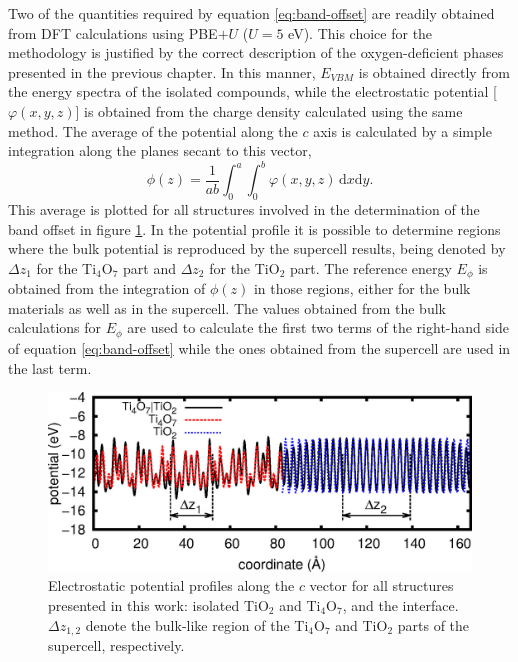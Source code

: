 Two of the quantities required by equation \ref{eq:band-offset} are readily obtained from DFT calculations using PBE$+U$ ($U = 5$ eV). This choice for the methodology is justified by the correct description of the oxygen-deficient phases presented in the previous chapter. In this manner, $E_{VBM}$ is obtained directly from the energy spectra of the isolated compounds, while the electrostatic potential [$\varphi(x,y,z)$] is obtained from the charge density calculated using the same method. The average of the potential along the $c$ axis is calculated by a simple integration along the planes secant to this vector,
\begin{equation}
 \phi(z) = \frac{1}{ab}\int_0^a \int_0^b \varphi(x,y,z) \, \mathrm{d}x \mathrm{d}y.
 \label{eq:partial}
\end{equation}
This average is plotted for all structures involved in the determination of the band offset in figure \ref{fig:potential}. In the potential profile it is possible to determine regions where the bulk potential is reproduced by the supercell results, being denoted by $\Delta z_1$ for the Ti$_4$O$_7$ part and $\Delta z_2$ for the TiO$_2$ part. The reference energy $E_{\phi}$ is obtained from the integration of $\phi(z)$ in those regions, either for the bulk materials as well as in the supercell. The values obtained from the bulk calculations for $E_{\phi}$ are used to calculate the first two terms of the right-hand side of equation \ref{eq:band-offset} while the ones obtained from the supercell are used in the last term.
\begin{center}
 \begin{figure}[ht!]
  \begin{center}
   \includegraphics[width=0.9\columnwidth]{img/potential.jpg}
   \caption{Electrostatic potential profiles along the $c$ vector for all structures presented in this work: isolated TiO${}_2$ and Ti${}_4$O${}_7$, and the interface. $\Delta z_{1,2}$ denote the bulk-like region of the Ti$_4$O$_7$ and TiO$_2$ parts of the supercell, respectively.}
   \label{fig:potential} 
  \end{center}
 \end{figure}
\end{center}

